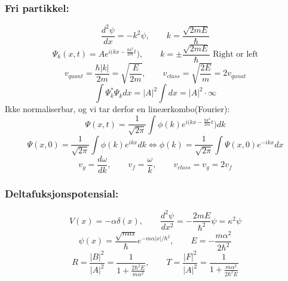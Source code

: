 \documentclass[a4paper,norsk, 10pt]{article}
\begin{document}
\subsubsection{Fri partikkel:}
\begin{equation}
\frac{d^2\psi}{dx} = -k^2\psi, \qquad k = \frac{\sqrt{2mE}}{\hbar}
\end{equation}
\begin{equation}
\Psi_k(x,t) = Ae^{i(kx - \frac{\hbar k^2}{2m}t}),\qquad k = \pm\frac{\sqrt{2mE}}{\hbar} \text{ Right or left}
\end{equation}
\begin{equation}
v_{quant} = \frac{\hbar |k|}{2m} = \sqrt{\frac{E}{2m}}, \qquad v_{class} = \sqrt{\frac{2E}{m}} = 2v_{qunat}
\end{equation}
\begin{equation}
\int \Psi_k^*\Psi_k dx = |A|^2\int dx = |A|^2\cdot \infty 
\end{equation}
Ikke normaliserbar, og vi tar derfor en lineærkombo(Fourier):
\begin{equation}
\Psi(x,t) = \frac{1}{\sqrt{2\pi}}\int \phi(k)e^{i(kx - \frac{\hbar k^2}{2m}t}) dk
\end{equation}
\begin{equation}
\Psi(x,0) = \frac{1}{\sqrt{2\pi}}\int \phi(k)e^{ikx} dk \Leftrightarrow \phi(k) = \frac{1}{\sqrt{2\pi}}\int \Psi(x,0)e^{-ikx} dx
\end{equation}
\begin{equation}
v_g = \frac{d\omega}{dk},\qquad v_f = \frac{\omega}{k}, \qquad v_{class} = v_g = 2v_f
\end{equation}
\subsubsection{Deltafuksjonspotensial:}
\begin{equation}
V(x) = -\alpha\delta(x),\qquad \frac{d^2\psi}{dx^2} = -\frac{2mE}{\hbar^2}\psi = \kappa^2\psi
\end{equation}
\begin{equation}
\psi(x) = \frac{\sqrt{m\alpha}}{\hbar}e^{-m\alpha |x|/\hbar^2},\qquad E = -\frac{m\alpha^2}{2\hbar^2}
\end{equation}
\begin{equation}
R = \frac{|B|^2}{|A|^2} = \frac{1}{1 + \frac{2\hbar^2E}{m\alpha^2}}, \qquad T = \frac{|F|^2}{|A|^2} = \frac{1}{1+ \frac{m\alpha^2}{2\hbar^2E}}
\end{equation}
\end{document}

